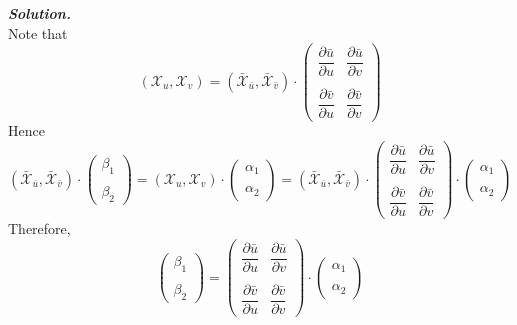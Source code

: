 \documentclass{article}
\begin{document}
\par
\textbf{\textit{Solution.}}\\
Note that
$$
    (\mathcal{X}_u, \mathcal{X}_v)
    =(\mathcal{\bar{X}}_{\bar{u}},\mathcal{\bar{X}}_{\bar{v}})
    \cdot
    \left(
        \begin{array}{cc}
            \dfrac{\partial{\bar{u}}}{\partial{u}} &\dfrac{\partial{\bar{u}}}{\partial{v}}\\\\
            \dfrac{\partial{\bar{v}}}{\partial{u}} &\dfrac{\partial{\bar{v}}}{\partial{v}}
        \end{array}
    \right)
$$
Hence
$$
(\mathcal{\bar{X}}_{\bar{u}}, \mathcal{\bar{X}}_{\bar{v}}) \cdot 
\left(
    \begin{array}{c}
        \beta_1\\\\
        \beta_2
    \end{array}
\right)
=
(\mathcal{X}_u, \mathcal{X}_v) \cdot 
\left(
    \begin{array}{c}
        \alpha_1\\\\
        \alpha_2
    \end{array}
\right)
=
(\mathcal{\bar{X}}_{\bar{u}},\mathcal{\bar{X}}_{\bar{v}})
    \cdot
    \left(
        \begin{array}{cc}
            \dfrac{\partial{\bar{u}}}{\partial{u}} &\dfrac{\partial{\bar{u}}}{\partial{v}}\\\\
            \dfrac{\partial{\bar{v}}}{\partial{u}} &\dfrac{\partial{\bar{v}}}{\partial{v}}
        \end{array}
    \right)
    \cdot
    \left(
    \begin{array}{c}
        \alpha_1\\\\
        \alpha_2
    \end{array}
\right)
$$
Therefore,
$$
\left(
    \begin{array}{c}
        \beta_1\\\\
        \beta_2
    \end{array}
\right)=
\left(
        \begin{array}{cc}
            \dfrac{\partial{\bar{u}}}{\partial{u}} &\dfrac{\partial{\bar{u}}}{\partial{v}}\\\\
            \dfrac{\partial{\bar{v}}}{\partial{u}} &\dfrac{\partial{\bar{v}}}{\partial{v}}
        \end{array}
    \right)
    \cdot
    \left(
    \begin{array}{c}
        \alpha_1\\\\
        \alpha_2
    \end{array}
\right)
$$
\end{document}
